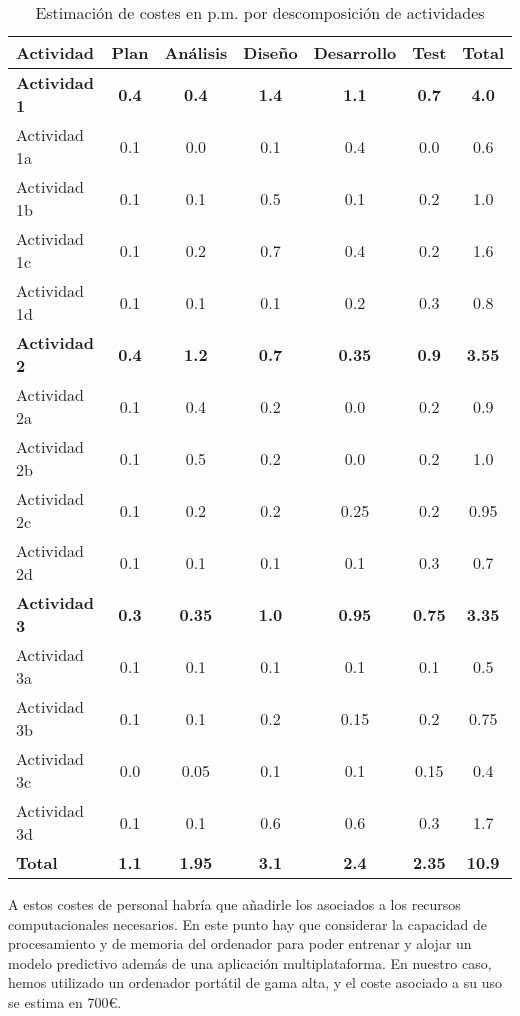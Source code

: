 \setlength{\tabcolsep}{5pt} 
\begin{table}[H]
\centering
\begin{tabular}{lccccc|c}
\textbf{Actividad} & \textbf{Plan} & \textbf{Análisis} & \textbf{Diseño} & \textbf{Desarrollo} & \textbf{Test
} & \textbf{Total} \\ \hline \hline

\textbf{Actividad 1}  & \textbf{0.4} & \textbf{0.4} & \textbf{1.4} &\textbf{ 1.1} &\textbf{ 0.7 }&\textbf{ 4.0} \\ \hline
Actividad 1a & 0.1 & 0.0 & 0.1 & 0.4 & 0.0 & 0.6 \\
Actividad 1b & 0.1 & 0.1 & 0.5 & 0.1 & 0.2 & 1.0 \\
Actividad 1c & 0.1 & 0.2 & 0.7 & 0.4 & 0.2 & 1.6 \\
Actividad 1d & 0.1 & 0.1 & 0.1 & 0.2 & 0.3 & 0.8  \\ \hline \hline

\textbf{Actividad 2 }& \textbf{0.4} & \textbf{1.2 }& \textbf{0.7} & \textbf{0.35} & \textbf{0.9} & \textbf{3.55}  \\ \hline
Actividad 2a & 0.1 & 0.4 & 0.2 & 0.0 & 0.2 & 0.9 \\
Actividad 2b & 0.1 & 0.5 & 0.2  & 0.0 & 0.2 & 1.0 \\
Actividad 2c & 0.1 & 0.2 & 0.2 & 0.25 & 0.2 & 0.95 \\
Actividad 2d & 0.1 & 0.1 & 0.1 & 0.1 & 0.3 & 0.7 \\ \hline \hline

\textbf{Actividad 3 }& \textbf{0.3} & \textbf{0.35} & \textbf{1.0} & \textbf{0.95} & \textbf{0.75} & \textbf{3.35} \\ \hline
Actividad 3a & 0.1 & 0.1 & 0.1 & 0.1 & 0.1 & 0.5 \\
Actividad 3b & 0.1 & 0.1 & 0.2 & 0.15 & 0.2 & 0.75 \\
Actividad 3c & 0.0 & 0.05 & 0.1 & 0.1 & 0.15 & 0.4 \\
Actividad 3d & 0.1 & 0.1 & 0.6 & 0.6 & 0.3 & 1.7 \\ \hline \hline

\textbf{Total} & \textbf{1.1} & \textbf{1.95} & \textbf{ 3.1} &\textbf{ 2.4} & \textbf{2.35} & \textbf{10.9}
\end{tabular}
\caption{Estimación de costes en p.m. por descomposición de actividades\label{tab:estimacion}}
\end{table}

A estos costes de personal habría que añadirle los asociados a los recursos computacionales necesarios. En este punto hay que considerar la capacidad de procesamiento y de memoria del ordenador para poder entrenar y alojar un modelo predictivo además de una aplicación multiplataforma. En nuestro caso, hemos utilizado un ordenador portátil de gama alta, y el coste asociado a su uso se estima en 700\euro.



